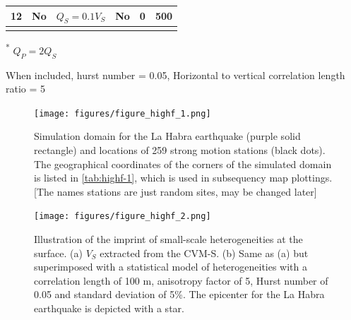 \begin{table}[!ht]
\begin{threeparttable}
{\begin{tabular}{@{}cccccc@{}}
        12       & No         & $Q_S=0.1V_S$                      & No                     & 0                             & 500                  
        \\ \bottomrule
        \\[-5mm]
      \end{tabular}%
    }
    \begin{tablenotes}
      \item[\textsuperscript{*}] \footnotesize $Q_P=2Q_S$\\[-10pt]
      \item[\textdagger] \footnotesize When included, hurst number = 0.05, Horizontal to vertical correlation length ratio = 5
    \end{tablenotes}
  \end{threeparttable}
\end{table}
\clearpage


\begin{figure}[!ht]
  \centering
  \texttt{[image: figures/figure\_highf\_1.png]}
  \caption{Simulation domain for the La Habra earthquake (purple solid rectangle) and locations of 259 strong motion stations (black dots). The geographical coordinates of the corners of the simulated domain is listed in \cref{tab:highf-1}, which is used in subsequency map plottings. [The names stations are just random sites, may be changed later]}
  \label{fig:highf-1}
\end{figure}
\clearpage

\begin{figure}[!ht]
  \centering
  \texttt{[image: figures/figure\_highf\_2.png]}
  \caption{Illustration of the imprint of small-scale heterogeneities at the surface. (a) $V_S$ extracted from the CVM-S. (b) Same as (a) but superimposed with a statistical model of heterogeneities with a correlation length of 100 m, anisotropy factor of 5, Hurst number of 0.05 and standard deviation of 5\%. The epicenter for the La Habra earthquake is depicted with a star.}
  \label{fig:highf-2}
\end{figure}
\clearpage

